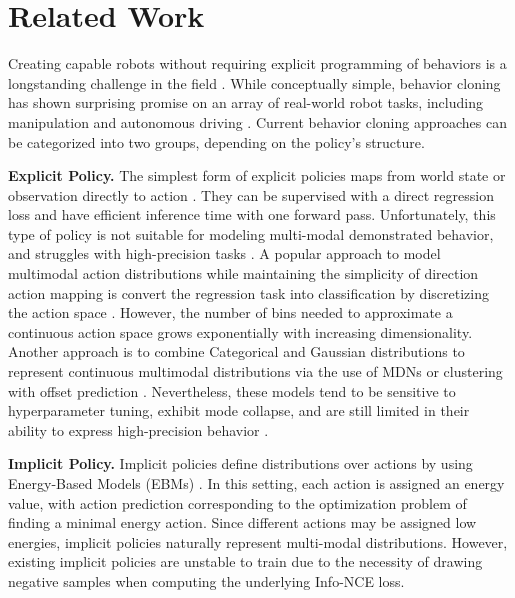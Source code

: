 
\section{Related Work}
Creating capable robots without requiring explicit programming of behaviors is a longstanding challenge in the field \cite{atkeson1997robot, argall2009survey, ravichandar2020recent}.
While conceptually simple, behavior cloning has shown surprising promise on an array of real-world robot tasks, including manipulation \cite{zhang2018deep, florence2019self, mandlekar2020learning, mandlekar2020iris, zeng2021transporter, rahmatizadeh2018vision, avigal2022speedfolding} and autonomous driving \cite{pomerleau1988alvinn, bojarski2016end}. Current behavior cloning approaches can be categorized into two groups, depending on the policy's structure.


\textbf{Explicit Policy.}
The simplest form of explicit policies maps from world state or observation directly to action \cite{pomerleau1988alvinn, zhang2018deep, florence2019self, ross2011reduction, toyer2020magical, rahmatizadeh2018vision, bojarski2016end}. They can be supervised with a direct regression loss and have efficient inference time with one forward pass. Unfortunately, this type of policy is not suitable for modeling multi-modal demonstrated behavior,
and struggles with high-precision tasks \cite{ibc}.
A popular approach to model multimodal action distributions while maintaining the simplicity of direction action mapping is convert the regression task into classification by discretizing the action space \cite{zeng2021transporter, wu2020spatial, avigal2022speedfolding}.
However, the number of bins needed to approximate a continuous action space grows exponentially with increasing dimensionality.
Another approach is to combine Categorical and Gaussian distributions to represent continuous multimodal distributions via the use of MDNs \cite{bishop1994mixture, robomimic} or clustering with offset prediction \cite{bet, sharma2018multiple}. Nevertheless, these models tend to be sensitive to hyperparameter tuning, exhibit mode collapse, and are still limited in their ability to express high-precision behavior \cite{ibc}.



\textbf{Implicit Policy.}
Implicit policies \citep{ibc, jarrett2020strictly} define distributions over actions by using Energy-Based Models (EBMs) \citep{lecun06atutorial, du2019implicit, dai2019exponential, grathwohl2020stein, du2020improved}.
In this setting, each action is assigned an energy value, with action prediction corresponding to the optimization problem of finding a minimal energy action. Since different actions may be assigned low energies, implicit policies naturally represent multi-modal distributions. However, existing implicit policies \citep{ibc} are unstable to train due to the necessity of drawing negative samples when computing the underlying Info-NCE loss. %







